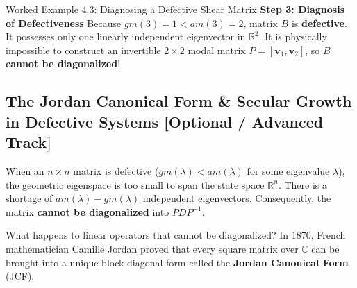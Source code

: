 \begin{examplebox}{Worked Example 4.3: Diagnosing a Defective Shear Matrix}
\textbf{Step 3: Diagnosis of Defectiveness}
Because $gm(3) = 1 < am(3) = 2$, matrix $B$ is \textbf{defective}. It possesses only one linearly independent eigenvector in $\mathbb{R}^2$. It is physically impossible to construct an invertible $2 \times 2$ modal matrix $P = [\mathbf{v}_1, \mathbf{v}_2]$, so $B$ \textbf{cannot be diagonalized}!
\end{examplebox}

\subsection{The Jordan Canonical Form \& Secular Growth in Defective Systems [Optional / Advanced Track]}
\label{subsec:jordan_form}

When an $n \times n$ matrix is defective ($gm(\lambda) < am(\lambda)$ for some eigenvalue $\lambda$), the geometric eigenspace is too small to span the state space $\mathbb{R}^n$. There is a shortage of $am(\lambda) - gm(\lambda)$ independent eigenvectors. Consequently, the matrix \textbf{cannot be diagonalized} into $P D P^{-1}$.

What happens to linear operators that cannot be diagonalized? In 1870, French mathematician Camille Jordan proved that every square matrix over $\mathbb{C}$ can be brought into a unique block-diagonal form called the \textbf{Jordan Canonical Form} (JCF).

